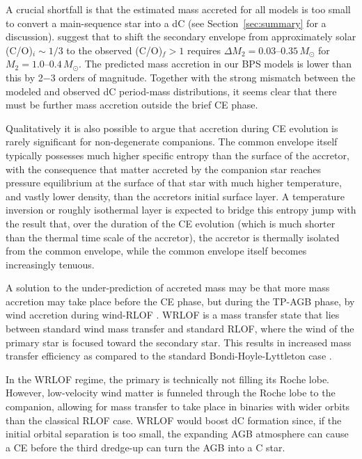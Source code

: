 \documentclass[twocolumn]{aastex631}
\begin{document}
A crucial shortfall is that the estimated mass accreted for all models is too small to convert a main-sequence star into a dC (see Section~\ref{sec:summary} for a discussion). 
\citet{Miszalski2013} suggest that to shift the secondary envelope from approximately solar (C/O)$_i \sim1/3$ to the observed (C/O)$_f >1$ requires $\Delta M_2 = 0.03$–$0.35\,M_\odot$ for $M_2 = 1.0$–$0.4\,M_\odot$. The predicted mass accretion in our BPS models is lower than this by 2$-$3 orders of magnitude.  Together with the strong mismatch between the modeled and observed dC period-mass distributions, it seems clear that there must be further mass accretion outside the brief CE phase. 



Qualitatively it is also possible to argue that accretion during CE evolution is rarely significant for non-degenerate companions. The common envelope itself typically possesses much higher specific entropy than the surface of the accretor, with the consequence that matter accreted by the companion star reaches pressure equilibrium at the surface of that star with much higher temperature, and vastly lower density, than the accretors initial surface layer. A temperature inversion or roughly isothermal layer is expected to bridge this entropy jump with the result that, over the duration of the CE evolution (which is much shorter than the thermal time scale of the accretor), the accretor is thermally isolated from the common envelope, while the common envelope itself becomes increasingly tenuous.

A solution to the under-prediction of accreted mass may be that more mass accretion may take place before the CE phase, but during the TP-AGB phase, by wind accretion during wind-RLOF \citep[WRLOF;][]{Mohamed2007}. WRLOF is a mass transfer state that lies between standard wind mass transfer and standard RLOF, where the wind of the primary star is focused toward the secondary star. This results in increased mass transfer efficiency as compared to the standard Bondi-Hoyle-Lyttleton case \citep{Hoyle1939, Bondi1944}. 

In the WRLOF regime, the primary is technically not filling its Roche lobe. However, low-velocity wind matter is funneled through the Roche lobe to the companion, allowing for mass transfer to take place in binaries with wider orbits than the classical RLOF case. WRLOF would boost dC formation since, if the initial orbital separation is too small, the expanding AGB atmosphere can cause a CE before the third dredge-up can turn the AGB into a C star.
\end{document}
